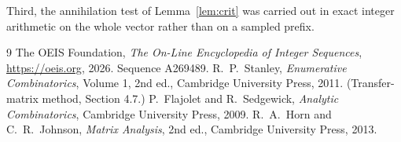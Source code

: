 \documentclass[11pt,a4paper]{article}
\theoremstyle{plain}
\theoremstyle{definition}
\begin{document}
Third, the annihilation test of Lemma~\ref{lem:crit} was carried out in exact integer
arithmetic on the whole vector rather than on a sampled prefix.

\begin{thebibliography}{9}
 The OEIS Foundation, \emph{The On-Line Encyclopedia of Integer
Sequences}, \url{https://oeis.org}, 2026. Sequence A269489.
 R.~P.~Stanley, \emph{Enumerative Combinatorics}, Volume 1, 2nd ed.,
Cambridge University Press, 2011. (Transfer-matrix method, Section 4.7.)
 P.~Flajolet and R.~Sedgewick, \emph{Analytic Combinatorics}, Cambridge
University Press, 2009.
 R.~A.~Horn and C.~R.~Johnson, \emph{Matrix Analysis}, 2nd ed., Cambridge
University Press, 2013.
\end{thebibliography}
\end{document}

